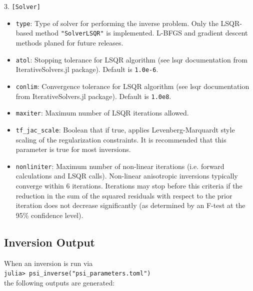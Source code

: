 3. \texttt{[Solver]}
\begin{itemize}
    \item \texttt{type}: Type of solver for performing the inverse problem. Only the LSQR-based method \texttt{"SolverLSQR"} is implemented. L-BFGS and gradient descent methods planed for future releases.
    \item \texttt{atol}: Stopping tolerance for LSQR algorithm (see lsqr documentation from IterativeSolvers.jl package). Default is \texttt{1.0e-6}.
    \item \texttt{conlim}: Convergence tolerance for LSQR algorithm (see lsqr documentation from IterativeSolvers.jl package). Default is \texttt{1.0e8}.
    \item \texttt{maxiter}: Maximum number of LSQR iterations allowed.
    \item \texttt{tf\_jac\_scale}: Boolean that if true, applies Levenberg-Marquardt style scaling of the regularization constraints. It is recommended that this parameter is true for most inversions.
    \item \texttt{nonliniter}: Maximum number of non-linear iterations (i.e. forward calculations and LSQR calls). Non-linear anisotropic inversions typically converge within 6 iterations. Iterations may stop before this criteria if the reduction in the sum of the squared residuals with respect to the prior iteration does not decrease significantly (as determined by an F-test at the 95\% confidence level).
\end{itemize}


\subsection{Inversion Output} \label{inverse_output}
When an inversion is run via\\
\texttt{julia> psi\_inverse("psi\_parameters.toml")}\\
the following outputs are generated:

